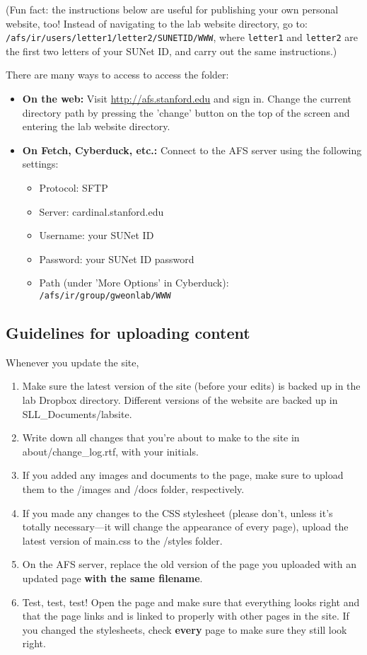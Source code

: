 \documentclass{article}
\begin{document}
(Fun fact: the instructions below are useful for publishing your own personal website, too! Instead of navigating to the lab website directory, go to: \texttt{/afs/ir/users/letter1/letter2/SUNETID/WWW}, where \texttt{letter1} and \texttt{letter2} are the first two letters of your SUNet ID, and carry out the same instructions.)

There are many ways to access to access the folder:
\begin{itemize}
	\item \textbf{On the web:} Visit \url{http://afs.stanford.edu} and sign in. Change the current directory path by pressing the 'change' button on the top of the screen and entering the lab website directory.
	\item \textbf{On Fetch, Cyberduck, etc.:} Connect to the AFS server using the following settings:
		\begin{itemize}
			\item Protocol: SFTP
			\item Server: cardinal.stanford.edu
			\item Username: your SUNet ID
			\item Password: your SUNet ID password
			\item Path (under 'More Options' in Cyberduck): \texttt{/afs/ir/group/gweonlab/WWW}
		\end{itemize}
\end{itemize}

\subsection{Guidelines for uploading content}

Whenever you update the site,
\begin{enumerate}
	\item Make sure the latest version of the site (before your edits) is backed up in the lab Dropbox directory. Different versions of the website are backed up in SLL\_Documents/labsite.
	\item Write down all changes that you're about to make to the site in about/change\_log.rtf, with your initials.
	\item If you added any images and documents to the page, make sure to upload them to the /images and /docs folder, respectively.
	\item If you made any changes to the CSS stylesheet (please don't, unless it's totally necessary---it will change the appearance of every page), upload the latest version of main.css to the /styles folder.
	\item On the AFS server, replace the old version of the page you uploaded with an updated page \textbf{with the same filename}.
	\item Test, test, test! Open the page and make sure that everything looks right and that the page links and is linked to properly with other pages in the site. If you changed the stylesheets, check \textbf{every} page to make sure they still look right.
\end{enumerate}
\end{document}
